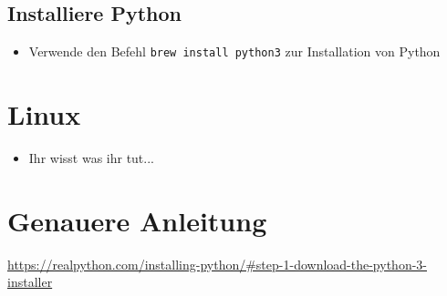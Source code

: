 \documentclass[accentcolor=tud3c,colorbacktitle,12pt]{tudexercise}
\begin{document}
\subsection*{Installiere Python}
\begin{itemize}
	\item Verwende den Befehl \texttt{brew install python3} zur Installation von Python
\end{itemize}

\section*{Linux}
\begin{itemize}
	\item Ihr wisst was ihr tut...
\end{itemize}

\section*{Genauere Anleitung}
 \url{https://realpython.com/installing-python/#step-1-download-the-python-3-installer}
\end{document}
